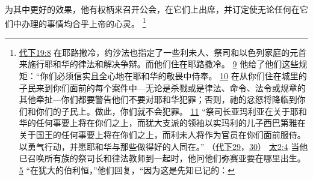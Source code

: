 \documentclass[12pt, a4paper, oneside]{ctexart}
\begin{document}
	为其中更好的效果，他有权柄来召开公会，在它们上出席，并订定使无论任何在它们中办理的事情均合乎上帝的心灵。
	\footnote {
		\href{https://biblehub.com/2_chronicles/19-8.htm}{代下19:8} 在耶路撒冷，约沙法也指定了一些利未人、祭司和以色列家庭的元首来施行耶和华的律法和解决争辩。而他们住在耶路撒冷。
		\href{https://biblehub.com/2_chronicles/19-9.htm}{9} 他给了他们这些规矩：“你们必须信实且全心地在耶和华的敬畏中侍奉。
		\href{https://biblehub.com/2_chronicles/19-10.htm}{10} 在从你们住在城里的子民来到你们面前的每个案件中---无论是杀戮或是律法、命令、法令或规章的其他牵扯---你们都要警告他们不要对耶和华犯罪；否则，祂的忿怒将降临到你们和你们的子民上。做此，你们就不会犯罪。
		\href{https://biblehub.com/2_chronicles/19-11.htm}{11} “祭司长亚玛利亚在关于耶和华的任何事要上将在你们之上，而犹大支派的领袖以实玛利的儿子西巴第雅在关于国王的任何事要上将在你们之上，而利未人将作为官员在你们面前服侍。以勇气行动，并愿耶和华与那些做得好的人同在。”
		（\href{https://biblehub.com/niv/2_chronicles/29.htm}{代下29}，\href{https://biblehub.com/niv/2_chronicles/30.htm}{30}） 
		\href{https://biblehub.com/matthew/2-4.htm}{太2:4} 当他已召唤所有族的祭司长和律法教师到一起时，他问他们弥赛亚要在哪里出生。
		\href{https://biblehub.com/matthew/2-5.htm}{5} “在犹大的伯利恒，”他们回复，“因为这是先知已记的：
	}
\end{document}

